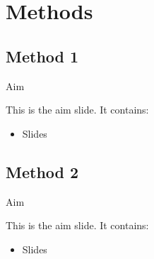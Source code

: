 \section{Methods}

    \subsection{Method 1}
    
        \begin{frame}{Aim}
        
            This is the aim slide.
            It contains:
            
            \begin{itemize}
            \item Slides
            \end{itemize}
        
        \end{frame}
        
        
    \subsection{Method 2}
    
        \begin{frame}{Aim}
        
            This is the aim slide.
            It contains:
            
            \begin{itemize}
            \item Slides
            \end{itemize}
        
        \end{frame}